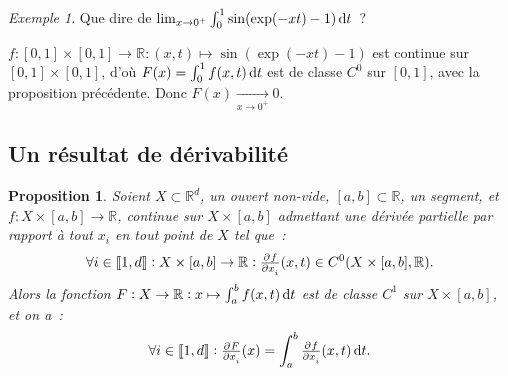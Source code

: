 \documentclass{report}
\newtheorem{prp}[thm]{Proposition}
\theoremstyle{definition}
\theoremstyle{remark}
\newtheorem{ex}{Exemple}[chapter]
\newcommand{\R}{\mathbb R}
\newcommand{\intint}[2]{\left\llbracket#1, #2\right\rrbracket}
\begin{document}
			\begin{ex} Que dire de $\lim_{x \to 0^+} \int_0^1\sin(\exp(-xt) - 1)\dif t$~?

			$f : [0, 1] \times [0, 1]  \to \R : (x, t) \mapsto \sin(\exp(-xt) - 1)$ est continue sur $[0, 1] \times [0, 1]$, d'où $F(x) = \int_0^1f(x, t)\dif t$
			est de classe $C^0$ sur $[0, 1]$, avec la proposition précédente. Donc $F(x) \xrightarrow[x \to 0^+]{} 0$.
			\end{ex}

		\subsection{Un résultat de dérivabilité}
			\begin{prp}\label{prp:dérivabilitésegmentfixe} Soient $X \subset \R^d$, un ouvert non-vide, $[a, b] \subset \R$, un segment, et
			$f : X \times [a, b] \to \R$, continue sur $X \times [a, b]$ admettant une dérivée partielle par rapport à tout $x_i$ en tout point de $X$ tel que~:
			\[\forall i \in \intint 1d : X \times [a, b] \to \R : \pd f{x_i}(x, t) \in C^0(X \times [a, b], \R).\]
			Alors la fonction $F : X \to \R : x \mapsto \int_a^b f(x, t)\dif t$ est de classe $C^1$ sur $X \times [a, b]$, et on a~:
			\[\forall i \in \intint 1d : \pd F{x_i}(x) = \int_a^b \pd f{x_i}(x, t)\dif t.\]
			\end{prp}
\end{document}
